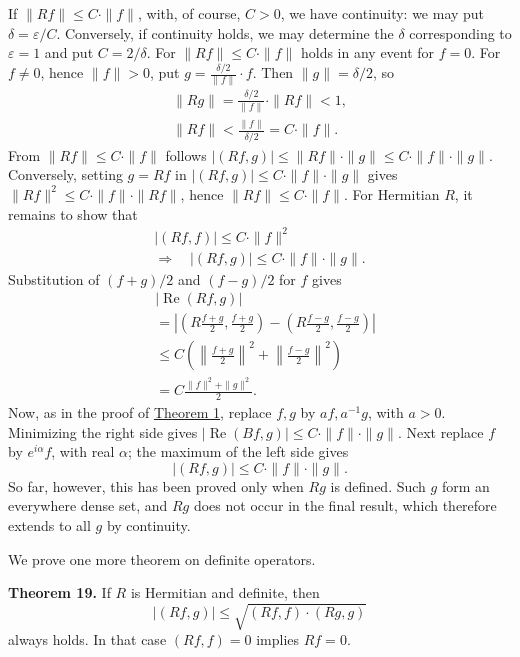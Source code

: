 \documentclass[fontsize=13pt,twoside,openany,headings=normal,parskip=false,bookmarkpackage=false,DIV=calc]{scrbook}
\begin{document}
If $\|Rf\|\leq C\cdot\|f\|$, with, of course, $C>0$, we have continuity: we may put $\delta=\varepsilon/C$. Conversely, if continuity holds, we may determine the $\delta$ corresponding to $\varepsilon=1$ and put $C=2/\delta$. For $\|Rf\|\leq C\cdot\|f\|$ holds in any event for $f=0$. For $f\ne0$, hence $\|f\|>0$, put $g=\frac{\delta/2}{\|f\|}\cdot f$. Then $\|g\|=\delta/2$, so
\begin{gather*}
\|Rg\|=\frac{\delta/2}{\|f\|}\cdot\|Rf\|<1,\\
\|Rf\|<\frac{\|f\|}{\delta/2}=C\cdot\|f\|.
\end{gather*}
From $\|Rf\|\leq C\cdot\|f\|$ follows $|(Rf,g)|\leq\|Rf\|\cdot\|g\|\leq C\cdot\|f\|\cdot\|g\|$. Conversely, setting $g=Rf$ in $|(Rf,g)|\leq C\cdot\|f\|\cdot\|g\|$ gives $\|Rf\|^2\leq C\cdot\|f\|\cdot\|Rf\|$, hence $\|Rf\|\leq C\cdot\|f\|$. For Hermitian $R$, it remains to show that
\begin{gather*}
|(Rf,f)|\leq C\cdot\|f\|^2\\
\Longrightarrow\quad |(Rf,g)|\leq C\cdot\|f\|\cdot\|g\|.
\end{gather*}
Substitution of $(f+g)/2$ and $(f-g)/2$ for $f$ gives
\begin{align*}
&|\operatorname{Re}(Rf,g)|\\
&=\left|\left(R\frac{f+g}{2},\frac{f+g}{2}\right)-\left(R\frac{f-g}{2},\frac{f-g}{2}\right)\right|\\
&\leq C\left(\left\|\frac{f+g}{2}\right\|^2+\left\|\frac{f-g}{2}\right\|^2\right)\\
&=C\frac{\|f\|^2+\|g\|^2}{2}.
\end{align*}
Now, as in the proof of \hyperref[thm:II.1]{Theorem 1}, replace $f,g$ by $af,a^{-1}g$, with $a>0$. Minimizing the right side gives $|\operatorname{Re}(Bf,g)|\leq C\cdot\|f\|\cdot\|g\|$. Next replace $f$ by $e^{i\alpha}f$, with real $\alpha$; the maximum of the left side gives
\[
|(Rf,g)|\leq C\cdot\|f\|\cdot\|g\|.
\]
So far, however, this has been proved only when $Rg$ is defined. Such $g$ form an everywhere dense set, and $Rg$ does not occur in the final result, which therefore extends to all $g$ by continuity.

We prove one more theorem on definite operators.

\hypertarget{origpage-53}{}%
\leavevmode{}\textbf{Theorem 19.}\label{thm:II.19} If $R$ is Hermitian and definite, then
\[
|(Rf,g)|\leq\sqrt{(Rf,f)\cdot(Rg,g)}
\]
always holds. In that case $(Rf,f)=0$ implies $Rf=0$.
\end{document}
